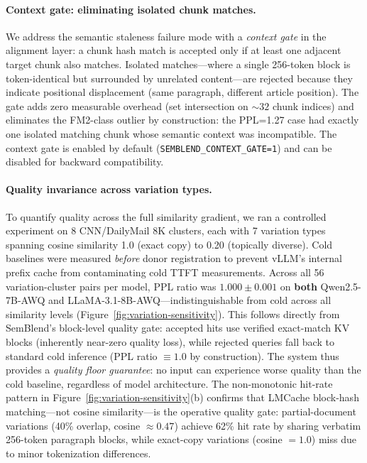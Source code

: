 \documentclass[10pt,twocolumn]{article}
\begin{document}
\paragraph{Context gate: eliminating isolated chunk matches.}
We address the semantic staleness failure mode with a
\emph{context gate} in the alignment layer: a chunk hash match is
accepted only if at least one adjacent target chunk also matches.
Isolated matches---where a single 256-token block is token-identical
but surrounded by unrelated content---are rejected because they
indicate positional displacement (same paragraph, different article
position). The gate adds zero measurable overhead (set intersection
on ${\sim}32$ chunk indices) and eliminates the FM2-class outlier by
construction: the PPL=1.27 case had exactly one isolated matching
chunk whose semantic context was incompatible. The context gate is
enabled by default (\texttt{SEMBLEND\_CONTEXT\_GATE=1}) and can be
disabled for backward compatibility.

\paragraph{Quality invariance across variation types.}
To quantify quality across the full similarity gradient, we ran
a controlled experiment on 8 CNN/DailyMail 8K clusters, each with
7 variation types spanning cosine similarity 1.0 (exact copy) to
0.20 (topically diverse). Cold baselines were measured \emph{before}
donor registration to prevent vLLM's internal prefix cache from
contaminating cold TTFT measurements. Across all 56 variation-cluster
pairs per model, PPL ratio was $1.000 \pm 0.001$ on \textbf{both}
Qwen2.5-7B-AWQ and LLaMA-3.1-8B-AWQ---indistinguishable from cold
across all similarity levels (Figure~\ref{fig:variation-sensitivity}).
This follows directly from SemBlend's block-level quality gate:
accepted hits use verified exact-match KV blocks (inherently near-zero
quality loss), while rejected queries fall back to standard cold
inference (PPL ratio $\equiv 1.0$ by construction). The system
thus provides a \emph{quality floor guarantee}: no input can experience
worse quality than the cold baseline, regardless of model architecture.
The non-monotonic hit-rate pattern in
Figure~\ref{fig:variation-sensitivity}(b) confirms that
LMCache block-hash matching---not cosine similarity---is the operative
quality gate: partial-document variations (40\% overlap, cosine
${\approx}0.47$) achieve 62\% hit rate by sharing verbatim 256-token
paragraph blocks, while exact-copy variations (cosine $=1.0$) miss
due to minor tokenization differences.
\end{document}
